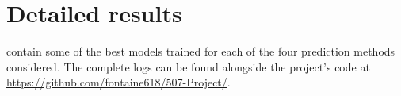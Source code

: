 \documentclass[bj, preprint]{imsart}
\begin{document}
\clearpage
\newpage
\section{Detailed results}\label{sec:res}
 contain some of the best models trained for each of the four prediction methods considered. The complete logs can be found alongside the project's code at \url{https://github.com/fontaine618/507-Project/}.





\end{document}
